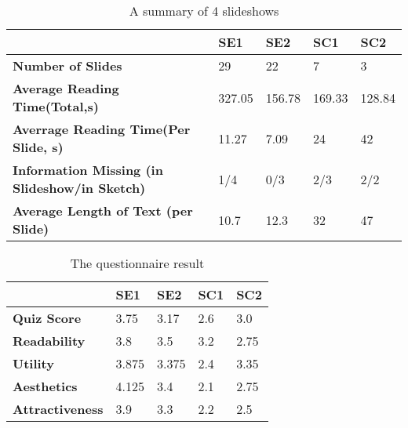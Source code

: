 \begin{table}
  \caption{A summary of 4 slideshows}
  \label{tab:slides1}
  \small
  \centering
  \begin{tabu}{p{2cm}|p{0.9cm}|p{0.9cm}|p{0.9cm}|p{0.9cm}}
  \toprule
 \textbf{} &\textbf{SE1} & \textbf{SE2} & \textbf{SC1}& \textbf{SC2} \\ 
   \midrule
  \textbf{Number of Slides } & 29  & 22 & 7 & 3 \\ 
 \midrule
  \textbf{Average Reading Time(Total,s)} & 327.05 & 156.78 & 169.33 & 128.84\\ 
 \midrule
  \textbf{Averrage Reading Time(Per Slide, s)} & 11.27 & 7.09 &24 & 42\\ 
   \midrule
  \textbf{Information Missing (in Slideshow/in Sketch) }& 1/4 & 0/3 & 2/3 & 2/2\\ 
     \midrule
  \textbf{Average Length of Text (per Slide) }& 10.7 & 12.3 & 32 & 47\\ 
    
  \bottomrule

  \end{tabu}
  \vspace{1mm}
\end{table}



\begin{table}[tb]
  \caption{The questionnaire result}
  \label{tab:slides2}
  \small
  \centering
  \begin{tabular}{p{1.5cm}|p{0.9cm}|p{0.9cm}|p{0.9cm}|p{0.9cm}}
  \toprule
 \textbf{} &\textbf{SE1} & \textbf{SE2} & \textbf{SC1}& \textbf{SC2} \\ 
   \midrule
  \textbf{Quiz Score } & 3.75  & 3.17 & 2.6 & 3.0 \\ 
 \midrule
 \midrule
  \textbf{Readability} & 3.8 & 3.5 & 3.2& 2.75\\ 
 \midrule
  \textbf{Utility} & 3.875 & 3.375 & 2.4 & 3.35\\ 
   \midrule
  \textbf{Aesthetics }  & 4.125 & 3.4 & 2.1& 2.75\\ 
  \midrule
  \textbf{Attractiveness} & 3.9 & 3.3 & 2.2 & 2.5\\ 
  
  \bottomrule

  \end{tabular}
  \vspace{1mm}
\end{table}


